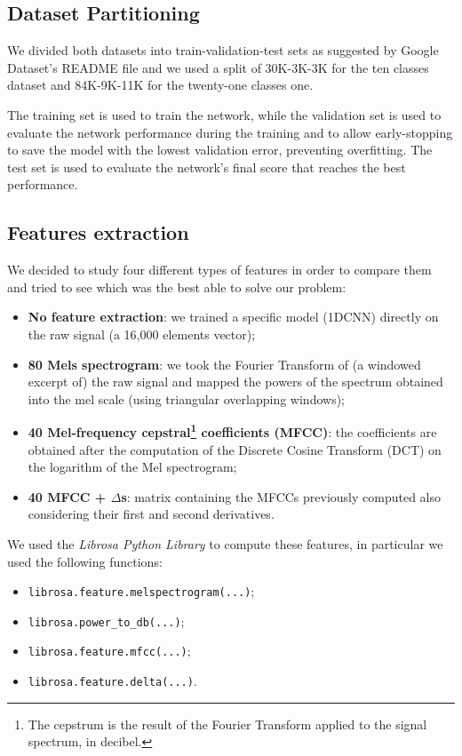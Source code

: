 \documentclass[conference]{IEEEtran}
\begin{document}
\subsection{Dataset Partitioning}
We divided both datasets into train-validation-test sets as suggested by Google Dataset’s README file and we used a split of 30K-3K-3K for the ten classes dataset and 84K-9K-11K for the twenty-one classes one. 

The training set is used to train the network, while the validation set is used to evaluate the network performance during the training and to allow early-stopping to save the model with the lowest validation error, preventing overfitting. The test set is used to evaluate the network’s final score that reaches the best performance.

\subsection{Features extraction}

We decided to study four different types of features in order to compare them and tried to see which was the best able to solve our problem:
\begin{itemize}
\item \textbf{No feature extraction}: we trained a specific model (1DCNN) directly on the raw signal (a 16,000 elements vector);
\item \textbf{80 Mels spectrogram}: we took the Fourier Transform of (a windowed excerpt of) the raw signal and mapped the powers of the spectrum obtained into the mel scale (using triangular overlapping windows);
\item \textbf{40 Mel-frequency cepstral\footnote{The cepstrum is the result of the Fourier Transform applied to the signal spectrum, in decibel.} coefficients (MFCC)}: the coefficients are obtained after the computation of the Discrete Cosine Transform (DCT) on the logarithm of the Mel spectrogram;
\item \textbf{40 MFCC + $\Delta$s}: matrix containing the MFCCs previously computed also considering their first and second derivatives.
\end{itemize}
We used the \textit{Librosa Python Library} to compute these features, in particular we used the following functions:
\begin{itemize}
\item \texttt{librosa.feature.melspectrogram(...)};
\item \texttt{librosa.power\_to\_db(...)};
\item \texttt{librosa.feature.mfcc(...)};
\item \texttt{librosa.feature.delta(...)}.
\end{itemize}
\end{document}
